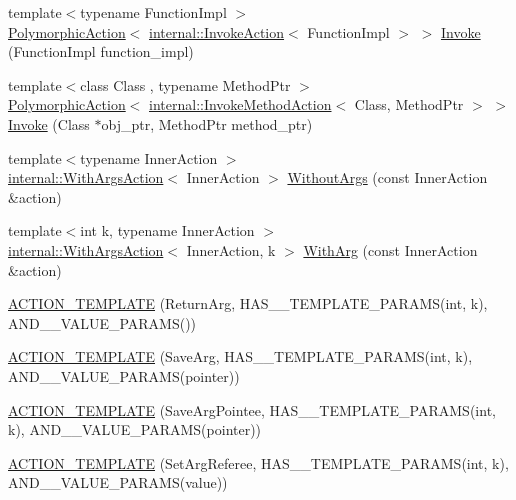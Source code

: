 \begin{DoxyCompactItemize}
{\footnotesize template$<$typename Function\+Impl $>$ }\\\hyperlink{classtesting_1_1_polymorphic_action}{Polymorphic\+Action}$<$ \hyperlink{classtesting_1_1internal_1_1_invoke_action}{internal\+::\+Invoke\+Action}$<$ Function\+Impl $>$ $>$ \hyperlink{namespacetesting_a12aebaf8363d49a383047529f798b694}{Invoke} (Function\+Impl function\+\_\+impl)
\item 
{\footnotesize template$<$class Class , typename Method\+Ptr $>$ }\\\hyperlink{classtesting_1_1_polymorphic_action}{Polymorphic\+Action}$<$ \hyperlink{classtesting_1_1internal_1_1_invoke_method_action}{internal\+::\+Invoke\+Method\+Action}$<$ Class, Method\+Ptr $>$ $>$ \hyperlink{namespacetesting_a80b82dc382445d240ff011f9c34aefc4}{Invoke} (Class $\ast$obj\+\_\+ptr, Method\+Ptr method\+\_\+ptr)
\item 
{\footnotesize template$<$typename Inner\+Action $>$ }\\\hyperlink{classtesting_1_1internal_1_1_with_args_action}{internal\+::\+With\+Args\+Action}$<$ Inner\+Action $>$ \hyperlink{namespacetesting_aeac85f74bd11112f69142e92e3a50780}{Without\+Args} (const Inner\+Action \&action)
\item 
{\footnotesize template$<$int k, typename Inner\+Action $>$ }\\\hyperlink{classtesting_1_1internal_1_1_with_args_action}{internal\+::\+With\+Args\+Action}$<$ Inner\+Action, k $>$ \hyperlink{namespacetesting_af76590c6cecc621e1ab4b681a9ea209b}{With\+Arg} (const Inner\+Action \&action)
\item 
\hyperlink{namespacetesting_a109d48f969260878ed1e743006196992}{A\+C\+T\+I\+O\+N\+\_\+\+T\+E\+M\+P\+L\+A\+TE} (Return\+Arg, H\+A\+S\+\_\+\_\+\+T\+E\+M\+P\+L\+A\+T\+E\+\_\+\+P\+A\+R\+A\+MS(int, k), A\+N\+D\+\_\+\_\+\+V\+A\+L\+U\+E\+\_\+\+P\+A\+R\+A\+MS())
\item 
\hyperlink{namespacetesting_a0478a3464d31f6726d5bc47b1be46491}{A\+C\+T\+I\+O\+N\+\_\+\+T\+E\+M\+P\+L\+A\+TE} (Save\+Arg, H\+A\+S\+\_\+\_\+\+T\+E\+M\+P\+L\+A\+T\+E\+\_\+\+P\+A\+R\+A\+MS(int, k), A\+N\+D\+\_\+\_\+\+V\+A\+L\+U\+E\+\_\+\+P\+A\+R\+A\+MS(pointer))
\item 
\hyperlink{namespacetesting_a31565a90ad7f08c1a88e4b138957172c}{A\+C\+T\+I\+O\+N\+\_\+\+T\+E\+M\+P\+L\+A\+TE} (Save\+Arg\+Pointee, H\+A\+S\+\_\+\_\+\+T\+E\+M\+P\+L\+A\+T\+E\+\_\+\+P\+A\+R\+A\+MS(int, k), A\+N\+D\+\_\+\_\+\+V\+A\+L\+U\+E\+\_\+\+P\+A\+R\+A\+MS(pointer))
\item 
\hyperlink{namespacetesting_adfd3c9538285d257370f955aa81488f1}{A\+C\+T\+I\+O\+N\+\_\+\+T\+E\+M\+P\+L\+A\+TE} (Set\+Arg\+Referee, H\+A\+S\+\_\+\_\+\+T\+E\+M\+P\+L\+A\+T\+E\+\_\+\+P\+A\+R\+A\+MS(int, k), A\+N\+D\+\_\+\_\+\+V\+A\+L\+U\+E\+\_\+\+P\+A\+R\+A\+MS(value))

\end{DoxyCompactItemize}
